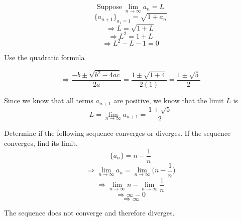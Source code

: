 \documentclass{article}
\newenvironment{problem}[2][Problem]{\begin{trivlist}
\item[\hskip \labelsep {\bfseries #1}\hskip \labelsep {\bfseries #2.}]}{\end{trivlist}}
\begin{document}
\[ \textrm{Suppose} ~ \lim_{n \rightarrow \infty} a_{n} = L \]
\[ \{ a_{n+1}\}_{a_{1} = 1} = \sqrt{1+a_{n}}\]
\[ \Rightarrow L = \sqrt{1 + L}\]
\[ \Rightarrow L^{2} = 1 + L \]
\[ \Rightarrow L^{2} - L - 1 = 0 \]
\begin{center}
  Use the quadratic formula
\end{center}

\[ \Rightarrow \frac{-b \pm \sqrt{b^{2}-4ac}}{2a} = \frac{1 \pm \sqrt{1+4}}{2(1)} = \frac{1 \pm \sqrt{5}}{2}\]

Since we know that all terms $ a_{n+1}$ are positive, we know
that the limit $ L $ is
\[ L = \lim_{n \rightarrow \infty} a_{n+1} =  \frac{1 + \sqrt{5}}{2}\]





\begin{problem}{1.1.4 (Problem 126)}
  Determine if the following sequence converges or diverges. If
  the sequence converges, find its limit.
  \[ \{a_{n}\} = n - \frac{1}{n}\]
  \[ \Rightarrow \lim_{n \rightarrow \infty} a_{n} = \lim_{n \rightarrow \infty} \Biggr(n-\frac{1}{n}\Biggr)\]
  \[ \Rightarrow \lim_{n \rightarrow \infty} n - \lim_{n \rightarrow \infty } \frac{1}{n}\]
  \[ \Rightarrow \infty - 0 \]
  \[ \Rightarrow \infty \]
  \begin{center}
    The sequence does not converge and therefore diverges.
  \end{center}

\end{problem}
\end{document}
